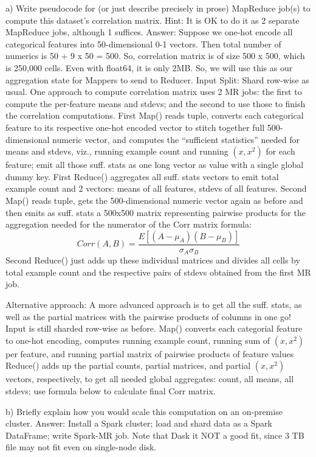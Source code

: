   a) Write pseudocode for (or just describe precisely in prose) MapReduce job(s) to compute this dataset's correlation matrix. Hint: It is OK to do it as 2 separate MapReduce jobs, although 1 suffices.
    Answer:
    Suppose we one-hot encode all categorical features into 50-dimensional 0-1 vectors. Then total number of numerics is 50 + 9 x 50 = 500. So, correlation matrix is of size 500 x 500, which is 250,000 cells. Even with float64, it is only 2MB. So, we will use this as our aggregation state for Mappers to send to Reducer.
    Input Split: Shard row-wise as usual. One approach to compute correlation matrix uses 2 MR jobs: the first to compute the per-feature means and stdevs; and the second to use those to finish the correlation computations. 
    First Map() reads tuple, converts each categorical feature to its respective one-hot encoded vector to stitch together full 500-dimensional numeric vector, and computes the “sufficient statistics” needed for means and stdevs, viz., running example count and running $(x, x^2)$ for each feature; emit all those suff. stats as one long vector as value with a single global dummy key. 
    First Reduce() aggregates all suff. stats vectors to emit total example count and 2 vectors: means of all features, stdevs of all features.
    Second Map() reads tuple, gets the 500-dimensional numeric vector again as before and then emits as suff. stats a 500x500 matrix representing pairwise products for the aggregation needed for the numerator of the Corr matrix formula: 
    $$Corr(A,B) = \frac{E[(A-\mu_A)(B-\mu_B)]}{\sigma_A \sigma_B}$$
    Second Reduce() just adds up these individual matrices and divides all cells by total example count and the respective pairs of stdevs obtained from the first MR job.

    Alternative approach:
    A more advanced approach is to get all the suff. stats, as well as the partial matrices with the pairwise products of columns in one go! Input is still sharded row-wise as before. 
    Map() converts each categorial feature to one-hot encoding, computes running example count, running sum of $(x, x^2)$ per feature, and running partial matrix of pairwise products of feature values 
    Reduce() adds up the partial counts, partial matrices, and partial $(x, x^2)$ vectors, respectively, to get all needed global aggregates: count, all means, all stdevs; use formula below to calculate final Corr matrix.
  
  b) Briefly explain how you would scale this computation on an on-premise cluster.
    Answer:
    Install a Spark cluster; load and shard data as a Spark DataFrame; write Spark-MR job. Note that Dask it NOT a good fit, since 3 TB file may not fit even on single-node disk. 

